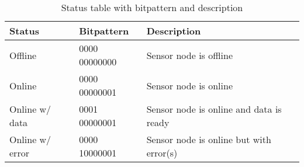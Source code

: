 \begin{table}[H]
\centering
\begin{tabular}{|l|l|l|}
	\hline
	Status & Bitpattern & Description \\ 
	\hline
	Offline 	& 0000 00000000 & Sensor node is offline \\
	\hline
	Online		& 0000 00000001 & Sensor node is online \\
	\hline
	Online w/ data & 0001 00000001 & Sensor node is online and data is ready \\
	\hline
	Online w/ error & 0000 10000001 & Sensor node is online but with error(s) \\
	\hline
\end{tabular}
\caption{Status table with bitpattern and description}
\label{table:statustable}
\end{table}


